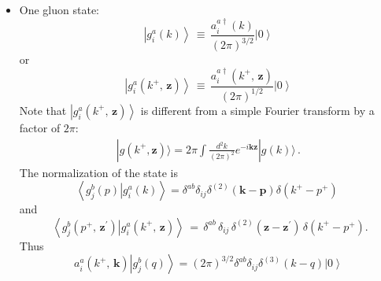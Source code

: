 \documentclass[10pt]{article}
\def\v#1{\mathbf{#1}}
\numberwithin{equation}{section}
\begin{document}
\begin{itemize}
  \item One gluon state:  
    \begin{equation}
      \label{gsta}
  \left|g_{i}^{a}(k)\right\rangle \,\equiv\,\frac{a_{i}^{a\dagger}(k)}{(2\pi)^{3/2}}\left|0\right\rangle 
\end{equation}
or 
\begin{equation}
  \label{gstax}
\left|g_{i}^{a}(k^{+},\, \mathbf{z})\right\rangle \,\equiv\,\frac{a_{i}^{a\dagger}(k^{+},\, \mathbf{z})}{(2\pi)^{1/2}}\left|0\right\rangle 
\end{equation}
Note that $\left|g_{i}^{a}(k^{+},\, \mathbf{z})\right\rangle$ is different from a simple Fourier transform by a factor of $2\pi$: 
\begin{align}
    |g(k^+,\v z) \rangle  = 2\pi \int \frac{d^2k}{(2\pi)^2}  e^{-i \v k \v z }   |g(k) \rangle\,.
\end{align}
The normalization of the state is 
$$
\left\langle g_{j}^{b}(p)\left|g_{i}^{a}(k)\right.\right\rangle
=\delta^{ab}\delta_{ij}\delta^{(2)}(\mathbf{k}-\mathbf{p})\delta(k^{+}-p^{+})\;$$ 
and 
$$\;
\left\langle g_{j}^{b}(p^{+},\,\mathbf{z}^{\prime})\left|g_{i}^{a}(k^{+},\,\mathbf{z})\right.\right\rangle 
\,=\,\delta^{ab}\,\delta_{ij}\,\delta^{(2)}(\mathbf{z}-\mathbf{z}^{\prime})\,\delta(k^{+}-p^{+}).
$$
Thus 
\begin{equation}
 a_{i}^{a}(k^{+},\, \mathbf{k})\left|g^b_j(q)\right\rangle = (2\pi )^{3/2}\delta^{ab} \delta_{ij}\delta^{(3)}(k-q)  \left| 0 \right\rangle
\end{equation}





\end{itemize}
\end{document}
